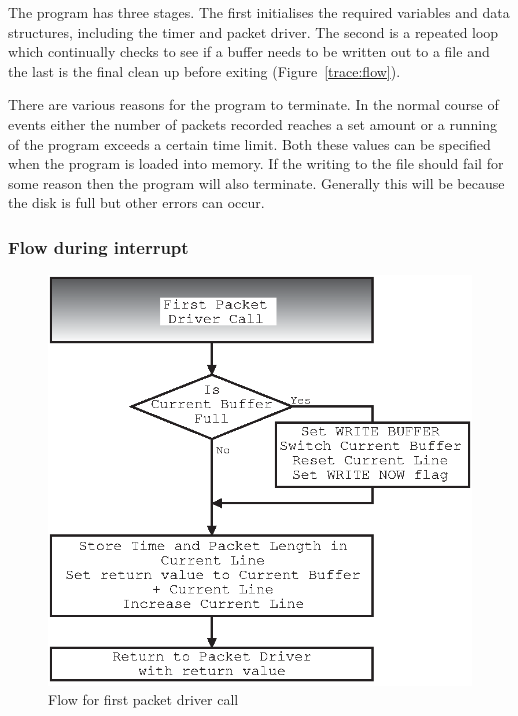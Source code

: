 The program has three stages.  The first initialises the required
variables and data structures, including the timer and packet driver.
The second is a repeated loop which continually checks to see if a
buffer needs to be written out to a file and the last is the final
clean up before exiting (Figure~\ref{trace:flow}).

There are various reasons for the program to terminate.  In the normal
course of events either the number of packets recorded reaches a set
amount or a running of the program exceeds a certain time limit.  Both
these values can be specified when the program is loaded into memory.
If the writing to the file should fail for some reason then the
program will also terminate.  Generally this will be because the disk
is full but other errors can occur.

\subsubsection{Flow during interrupt}

\begin{figure}
\begin{center}
\leavevmode
\includegraphics{pics/rcvPkt1-flow.eps}
\end{center}
\caption{Flow for first packet driver call}
\label{trace:rcvpkt1}
\end{figure}

